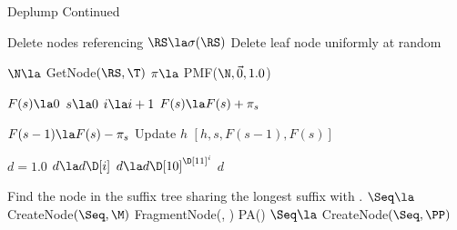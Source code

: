 \begin{algorithm}
    \caption{Deplump Continued}
    \begin{algorithmic}[1]
    
			\State Delete nodes referencing \RS[0]
			\State $\RS \la \sigma(\RS)$
		\EndWhile
			\State Delete leaf node uniformly at random
		\EndWhile

		\State $\N \la$ GetNode$(\RS, \T)$
		\State $\pi \la$ PMF($\N, \vec 0, 1.0$) 
		
		\State $F(s) \la 0$
		\State $s \la 0$
			\State $i \la i + 1$
			\State $F(s) \la F(s) + \pi_s$
		\EndWhile
		
		\State $F(s-1) \la F(s) - \pi_s$
		\State Update $h$
		\Return  $[h,s, F(s-1), F(s)]$
	\EndFunction
	
		\State $d = 1.0$
				\State $d \la d \D[i]$ 
			\Else
				\State $d \la d \D[10]^{\D[11]^i}$
			\EndIf
		\EndFor
		\State \Return $d$
	\EndFunction
    
		\State Find the node \M \space in the suffix tree sharing the longest suffix with \Seq.
			\If{$\Seq = \M$}
				\State \Return \M
			\Else
				\State $\Seq \la$ CreateNode$(\Seq, \M)$
				\State \Return \Seq
			\EndIf
		\Else
			\State \PP \la \space FragmentNode(\M, \Seq)
			\State PA(\M) \la \space \PP
			\State $\Seq \la $ CreateNode$(\Seq, \PP)$
			\State \Return \Seq
		\EndIf
	\EndFunction
    
    	    \end{algorithmic}
\end{algorithm}

